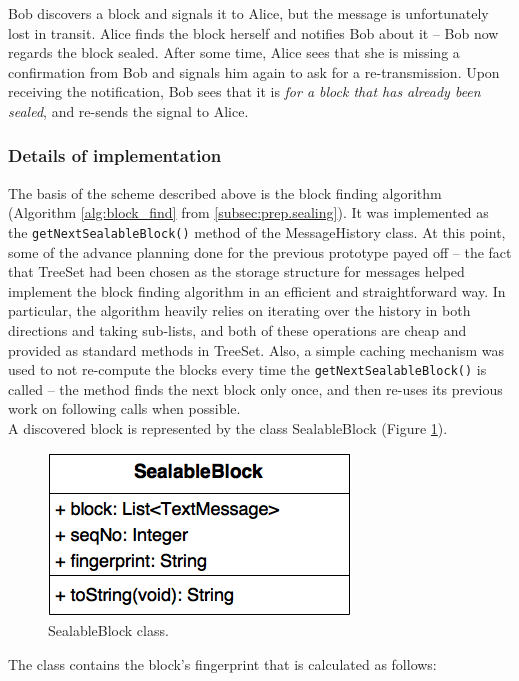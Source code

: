 \documentclass[a4paper, 12pt]{report}
\begin{document}
Bob discovers a block and signals it to Alice, but the message is unfortunately lost in transit. Alice finds the block herself and notifies Bob about it -- Bob now regards the block sealed. After some time, Alice sees that she is missing a confirmation from Bob and signals him again to ask for a re-transmission. Upon receiving the notification, Bob sees that it is \emph{for a block that has already been sealed}, and re-sends the signal to Alice. 


\subsubsection{Details of implementation}
The basis of the scheme described above is the block finding algorithm (Algorithm \ref{alg:block_find} from \cref{subsec:prep.sealing}). It was implemented as the \texttt{getNextSealableBlock()} method of the MessageHistory class. At this point, some of the advance planning done for the previous prototype payed off -- the fact that TreeSet had been chosen as the storage structure for messages helped implement the block finding algorithm in an efficient and straightforward way. In particular, the algorithm heavily relies on iterating over the history in both directions and taking sub-lists, and both of these operations are cheap and provided as standard methods in TreeSet. Also, a simple caching mechanism was used to not re-compute the blocks every time the \texttt{getNextSealableBlock()} is called -- the method finds the next block only once, and then re-uses its previous work on following calls when possible.\\

A discovered block is represented by the class SealableBlock (Figure \ref{fig:sealable_block_uml}).

\begin{figure}[H]
    \captionsetup{width=0.80\textwidth}
    \centering
    \includegraphics[width=0.4\linewidth]{pics/sealable_block_uml.png}
    \caption{\label{fig:sealable_block_uml} SealableBlock class.}
\end{figure}

The class contains the block's fingerprint that is calculated as follows:
\end{document}

